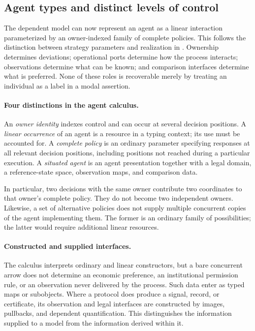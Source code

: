 \documentclass[11pt,a4paper]{article}
\numberwithin{equation}{section}
\theoremstyle{definition}
\theoremstyle{remark}
\theoremstyle{plain}
\begin{document}
\subsection{Agent types and distinct levels of control}
\label{agt-sec-orientation}

The dependent model can now represent an agent as a linear interaction
parameterized by an owner-indexed family of complete policies. This
follows the distinction between strategy parameters and realization in
\citet{CapucciEtAl2022Agency}. Ownership determines deviations; operational
ports determine how the process interacts; observations determine what can
be known; and comparison interfaces determine what is preferred. None of
these roles is recoverable merely by treating an individual as a label in a
modal assertion.

\paragraph{Four distinctions in the agent calculus.} An \emph{owner identity} indexes control and can occur at several decision
positions. A \emph{linear occurrence} of an agent is a resource in a typing
context; its use must be accounted for. A \emph{complete policy} is an ordinary
parameter specifying responses at all relevant decision positions, including
positions not reached during a particular execution. A \emph{situated agent}
is an agent presentation together with a legal domain, a reference-state
space, observation maps, and comparison data.

In particular, two decisions with the same owner contribute two coordinates
to that owner's complete policy. They do not become two independent owners.
Likewise, a set of alternative policies does not supply multiple concurrent
copies of the agent implementing them. The former is an ordinary family of
possibilities; the latter would require additional linear resources.

\paragraph{Constructed and supplied interfaces.}
The calculus interprets ordinary and linear constructors, but a bare
concurrent arrow does not determine an economic preference, an
institutional permission rule, or an observation never delivered by the
process. Such data enter as typed maps or subobjects. Where a protocol does
produce a signal, record, or certificate, its observation and legal
interfaces are constructed by images, pullbacks, and dependent
quantification. This distinguishes the information supplied to a model
from the information derived within it.
\end{document}
